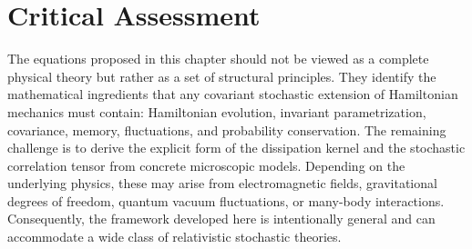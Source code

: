 \section*{Critical Assessment}
The equations proposed in this chapter should not be viewed as a
complete physical theory but rather as a set of structural principles.
They identify the mathematical ingredients that any covariant
stochastic extension of Hamiltonian mechanics must contain:
Hamiltonian evolution, invariant parametrization, covariance, memory,
fluctuations, and probability conservation.
The remaining challenge is to derive the explicit form of the
dissipation kernel and the stochastic correlation tensor from concrete
microscopic models. Depending on the underlying physics, these may arise
from electromagnetic fields, gravitational degrees of freedom, quantum
vacuum fluctuations, or many-body interactions. Consequently, the
framework developed here is intentionally general and can accommodate a
wide class of relativistic stochastic theories.

